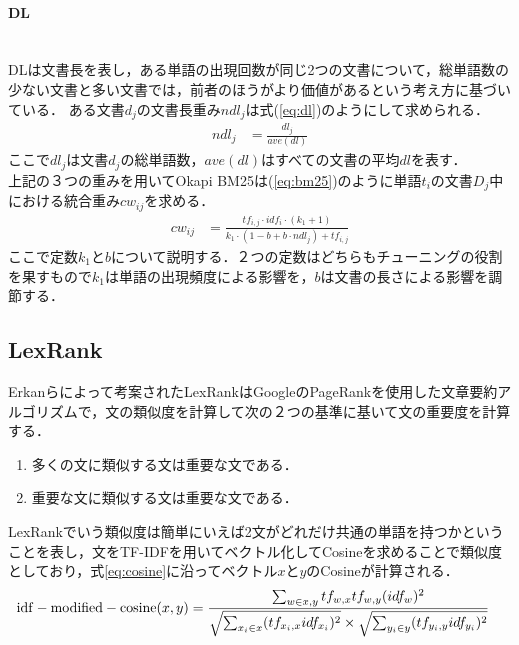 \paragraph{DL}\ \\
DLは文書長を表し，ある単語の出現回数が同じ2つの文書について，総単語数の少ない文書と多い文書では，前者のほうがより価値があるという考え方に基づいている．
ある文書$d_j$の文書長重み$ndl_j$は式(\ref{eq:dl})のようにして求められる．
\begin{equation}
\begin{aligned}
\label{eq:dl}
ndl_{j} & = \frac{dl_j}{ave(dl)}
\end{aligned}
\end{equation}
ここで$dl_j$は文書$d_j$の総単語数，$ave(dl)$はすべての文書の平均$dl$を表す．
\\
上記の３つの重みを用いてOkapi BM25は(\ref{eq:bm25})のように単語$t_i$の文書$D_j$中における統合重み$cw_{ij}$を求める．
\begin{equation}
\begin{aligned}
\label{eq:bm25}
cw_{ij} & = \frac{tf_{i,j} \cdot idf_{i} \cdot (k_1+ 1)}{k_1 \cdot (1 - b + b \cdot ndl_{j}  ) + tf_{i,j}  }
\end{aligned}
\end{equation}
ここで定数$k_1$と$b$について説明する．２つの定数はどちらもチューニングの役割を果すもので$k_1$は単語の出現頻度による影響を，$b$は文書の長さによる影響を調節する．
\subsection{LexRank}
Erkanら\cite{lexRank}によって考案されたLexRankはGoogleのPageRank\cite{pageRank1999}を使用した文章要約アルゴリズムで，文の類似度を計算して次の２つの基準に基いて文の重要度を計算する．
\begin{enumerate}
  \item 多くの文に類似する文は重要な文である．
  \item 重要な文に類似する文は重要な文である．
\end{enumerate}
LexRankでいう類似度は簡単にいえば2文がどれだけ共通の単語を持つかということを表し，文をTF-IDFを用いてベクトル化してCosineを求めることで類似度としており，式\ref{eq:cosine}に沿ってベクトル$x$と$y$のCosineが計算される．
\begin{equation}
\begin{aligned}
\label{eq:cosine}
{\rm idf-modified-cosine}(x,y) & = \frac{\sum_{w \in x,y} tf_{w,x} tf_{w,y} (idf_w)^2} {\sqrt{ \sum_{x_i \in x} ( tf_{x_i,x} idf_{x_i} )^2  } \times \sqrt{ \sum_{y_i \in y} ( tf_{y_i,y} idf_{y_i} )^2  }}
\end{aligned}
\end{equation}

